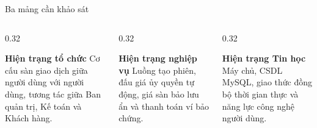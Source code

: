 \documentclass[aspectratio=169, 10pt]{beamer}
\begin{document}
\begin{frame}{Ba mảng cần khảo sát}
    \begin{columns}[t]
        \begin{column}{0.32\textwidth}
            \begin{block}{\centering \textbf{Hiện trạng tổ chức}}
                Cơ cấu sàn giao dịch giữa người dùng với người dùng, tương tác giữa Ban quản trị, Kế toán và Khách hàng.
            \end{block}
        \end{column}
        \begin{column}{0.32\textwidth}
            \begin{block}{\centering \textbf{Hiện trạng nghiệp vụ}}
                Luồng tạo phiên, đấu giá ủy quyền tự động, giá sàn bảo lưu ẩn và thanh toán ví bảo chứng.
            \end{block}
        \end{column}
        \begin{column}{0.32\textwidth}
            \begin{block}{\centering \textbf{Hiện trạng Tin học}}
                Máy chủ, CSDL MySQL, giao thức đồng bộ thời gian thực và năng lực công nghệ người dùng.
            \end{block}
        \end{column}
    \end{columns}
\end{frame}
\end{document}
